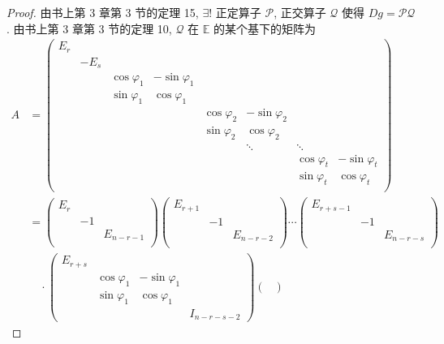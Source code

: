 \documentclass{ctexart}
\begin{document}
\begin{proof}
    由书上第 3 章第 3 节的定理 15, $\exists!$ 正定算子 $\mathcal{P}$, 正交算子 $\mathcal{Q}$ 使得 $Dg=\mathcal{PQ}$. 由书上第 3 章第 3 节的定理 10, $\mathcal{Q}$ 在 $\mathbb{E}$ 的某个基下的矩阵为
    \begin{align*}
        A & =\begin{pmatrix}
                E_r \\
                & -E_s \\
                && \cos\varphi_1 & -\sin\varphi_1 \\
                && \sin\varphi_1 & \cos\varphi_1 \\
                &&&& \cos\varphi_2 & -\sin\varphi_2 \\
                &&&& \sin\varphi_2 & \cos\varphi_2 \\
                &&&&& \ddots & \ddots \\
                &&&&&& \cos\varphi_t & -\sin\varphi_t \\
                &&&&&& \sin\varphi_t & \cos\varphi_t \\
            \end{pmatrix} \\
        & =\begin{pmatrix}
            E_r \\
            & -1 \\
            && E_{n-r-1} \\
        \end{pmatrix}\begin{pmatrix}
            E_{r+1} \\
            & -1 \\
            && E_{n-r-2} \\
        \end{pmatrix}\cdots\begin{pmatrix}
            E_{r+s-1} \\
            & -1 \\
            && E_{n-r-s} \\
        \end{pmatrix} \\
        & \quad\cdot\begin{pmatrix}
            E_{r+s} \\
            & \cos\varphi_1 & -\sin\varphi_1 \\
            & \sin\varphi_1 & \cos\varphi_1 \\
            &&& I_{n-r-s-2}
        \end{pmatrix}\begin{pmatrix}

\end{pmatrix}
\end{align*}
\end{proof}
\end{document}
